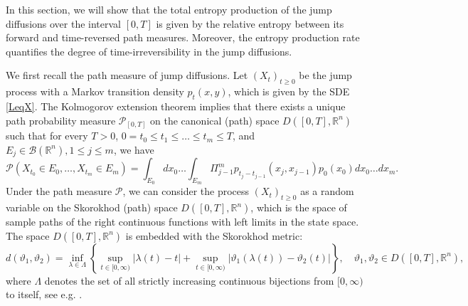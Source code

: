 \documentclass[10pt]{article}
\theoremstyle{definition}
\theoremstyle{remark}
\numberwithin{equation}{section}
\begin{document}
In this section, we will show that the total entropy production of the jump diffusions over the interval $[0,T]$ is given by the relative entropy between its forward and time-reversed path measures. Moreover, the entropy production rate quantifies the degree of time-irreversibility in the jump diffusions. 

We first recall the path measure of jump diffusions.
Let $(X_t)_{t\geq 0}$ be the jump process with a Markov transition density $p_t(x,y)$, which is given by the SDE \eqref{LeqX}. The Kolmogorov extension theorem implies that there exists a unique path probability measure $\mathcal{P}_{[0,T]}$ on the canonical (path) space $D([ 0,T], \mathbb{R}^n)$ such that for every $T>0$, $0 = t_{0} \leq t_1 \leq \dots \leq t_m \leq T$, and $E_j \in \mathscr{B}(\mathbb{R}^n), 1\leq j \leq m$, we have
\begin{equation*}
    \mathcal{P}(X_{t_0} \in E_0, \dots, X_{t_m} \in E_m) = \int_{E_0}dx_0\dots\int_{E_m} \Pi^m_{j-1} p_{t_j-t_{j-1}}(x_j,x_{j-1})p_0(x_0)dx_0 \dots dx_m.
\end{equation*}
Under the path measure $\mathcal{P}$, we can consider the process $(X_t)_{t\geq 0}$ as a random variable on the Skorokhod (path) space $D([ 0,T], \mathbb{R}^n)$, { which is the space of sample paths of the right continuous functions with left limits in the state space. The space $D([ 0,T], \mathbb{R}^n)$ is embedded with the Skorokhod metric:
\begin{equation*}
d(\vartheta_1, \vartheta_2)=\inf_{\lambda \in \Lambda} \left\{ \sup_{t \in [0,\infty)}|\lambda(t) - t| + \sup_{t \in [0,\infty)}\left| \vartheta_{1}(\lambda(t))-\vartheta_{2}(t)\right| \right\}, \quad \vartheta_1, \vartheta_2 \in D([ 0,T], \mathbb{R}^n),
\end{equation*}
where $\Lambda$ denotes the set of all strictly increasing continuous bijections from $[0,\infty)$ to itself, see e.g. \cite{A2004}}.

\end{document}
